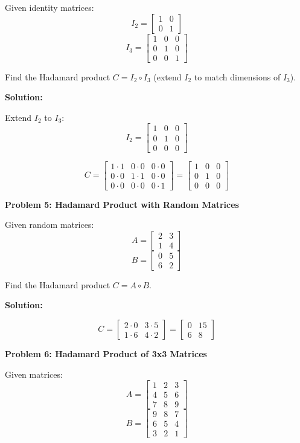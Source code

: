 \documentclass[
  letterpaper,
  DIV=11,
  numbers=noendperiod]{scrreprt}
\theoremstyle{plain}
\theoremstyle{definition}
\theoremstyle{remark}
\begin{document}
Given identity matrices: \[I_2=\begin{bmatrix}1&0\\0&1\end{bmatrix}\]
\[I_3=\begin{bmatrix}1&0&0\\0&1&0\\0&0&1\end{bmatrix}\]

Find the Hadamard product \(C=I_2\circ I_3\) (extend \(I_2\) to match
dimensions of \(I_3\)).

\textbf{Solution:}

Extend \(I_2\) to \(I_3\):
\[I_2=\begin{bmatrix}1&0&0\\0&1&0\\0&0&0\end{bmatrix}\]

\[C=\begin{bmatrix}
1\cdot1&0\cdot0&0\cdot0\\
0\cdot0&1\cdot1&0\cdot0\\
0\cdot0&0\cdot0&0\cdot1
\end{bmatrix}=
\begin{bmatrix}
1&0&0\\
0&1&0\\
0&0&0
\end{bmatrix}\]

\textbf{Problem 5: Hadamard Product with Random Matrices}

Given random matrices: \[A=\begin{bmatrix}2&3\\1&4\end{bmatrix}\]
\[B=\begin{bmatrix}0&5\\6&2\end{bmatrix}\]

Find the Hadamard product \(C=A\circ B\).

\textbf{Solution:}

\[C=\begin{bmatrix}
2\cdot0&3\cdot5\\
1\cdot6&4\cdot2
\end{bmatrix}=
\begin{bmatrix}
0&15\\
6&8
\end{bmatrix}\]

\textbf{Problem 6: Hadamard Product of 3x3 Matrices}

Given matrices: \[A=\begin{bmatrix}1&2&3\\4&5&6\\7&8&9\end{bmatrix}\]
\[B=\begin{bmatrix}9&8&7\\6&5&4\\3&2&1\end{bmatrix}\]
\end{document}
